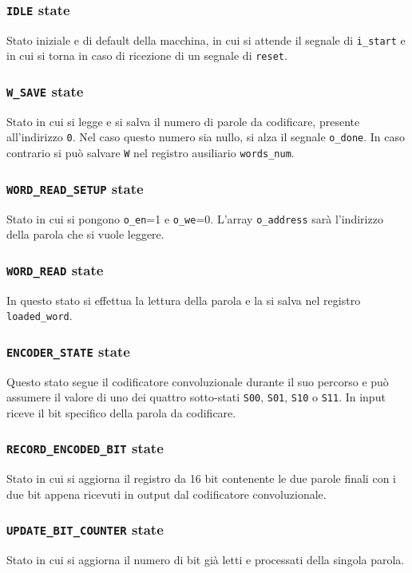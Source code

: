 \documentclass{article}
\begin{document}
\subsubsection{\texttt{IDLE} state}
Stato iniziale e di default della macchina, in cui si attende il segnale di \verb|i_start| e in cui si torna in caso di ricezione di un segnale di \verb|reset|.

\subsubsection{\texttt{W\_SAVE} state}
Stato in cui si legge e si salva il numero di parole da codificare, presente all'indirizzo \verb|0|. Nel caso questo numero sia nullo, si alza il segnale \verb|o_done|. In caso contrario si può salvare \verb|W| nel registro ausiliario \verb|words_num|.

\subsubsection{\texttt{WORD\_READ\_SETUP} state}
Stato in cui si pongono \verb|o_en|=1 e \verb|o_we|=0. L'array \verb|o_address| sarà l'indirizzo della parola che si vuole leggere.

\subsubsection{\texttt{WORD\_READ} state}
In questo stato si effettua la lettura della parola e la si salva nel registro \verb|loaded_word|.

\subsubsection{\texttt{ENCODER\_STATE} state}
Questo stato segue il codificatore convoluzionale durante il suo percorso e può assumere il valore di uno dei quattro sotto-stati \verb|S00|, \verb|S01|, \verb|S10| o \verb|S11|. In input riceve il bit specifico della parola da codificare.

\subsubsection{\texttt{RECORD\_ENCODED\_BIT} state}
Stato in cui si aggiorna il registro da 16 bit contenente le due parole finali con i due bit appena ricevuti in output dal codificatore convoluzionale.

\subsubsection{\texttt{UPDATE\_BIT\_COUNTER} state}
Stato in cui si aggiorna il numero di bit già letti e processati della singola parola.
\end{document}
